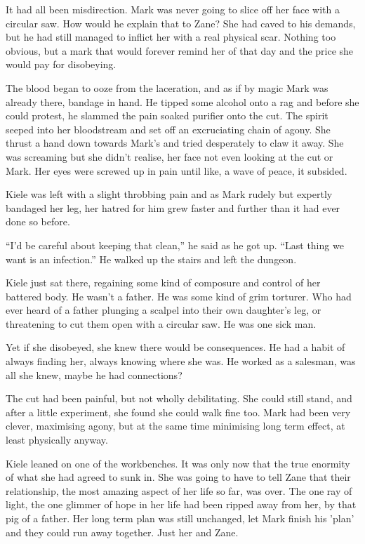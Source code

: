 It had all been misdirection.  Mark was never going to slice off her face with a circular saw.  How would he explain that to Zane?  She had caved to his demands, but he had still managed to inflict her with a real physical scar.  Nothing too obvious, but a mark that would forever remind her of that day and the price she would pay for disobeying.

The blood began to ooze from the laceration, and as if by magic Mark was already there, bandage in hand.  He tipped some alcohol onto a rag and before she could protest, he slammed the pain soaked purifier onto the cut.  The spirit seeped into her bloodstream and set off an excruciating chain of agony.  She thrust a hand down towards Mark's and tried desperately to claw it away.  She was screaming but she didn't realise, her face not even looking at the cut or Mark.  Her eyes were screwed up in pain until like, a wave of peace, it subsided.  

Kiele was left with a slight throbbing pain and as Mark rudely but expertly bandaged her leg, her hatred for him grew faster and further than it had ever done so before.

``I'd be careful about keeping that clean,'' he said as he got up.  ``Last thing we want is an infection.''  He walked up the stairs and left the dungeon.

Kiele just sat there, regaining some kind of composure and control of her battered body.  He wasn't a father.  He was some kind of grim torturer.  Who had ever heard of a father plunging a scalpel into their own daughter's leg, or threatening to cut them open with a circular saw.  He was one sick man.  

Yet if she disobeyed, she knew there would be consequences.  He had a habit of always finding her, always knowing where she was.  He worked as a salesman, was all she knew, maybe he had connections?

The cut had been painful, but not wholly debilitating.  She could still stand, and after a little experiment, she found she could walk fine too.  Mark had been very clever, maximising agony, but at the same time minimising long term effect, at least physically anyway.

Kiele leaned on one of the workbenches.  It was only now that the true enormity of what she had agreed to sunk in.  She was going to have to tell Zane that their relationship, the most amazing aspect of her life so far, was over.  The one ray of light, the one glimmer of hope in her life had been ripped away from her, by that pig of a father.  Her long term plan was still unchanged, let Mark finish his 'plan' and they could run away together.  Just her and Zane.  

